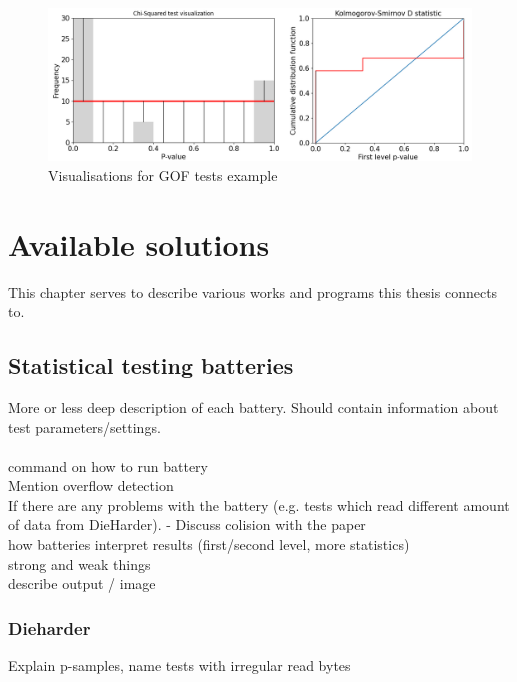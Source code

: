 \documentclass[
  digital,     %
  oneside,     %
  nosansbold,  %
  nocolorbold, %
  nolof,         %
  nolot,         %
]{fithesis4}
\begin{document}
\begin{figure}
  \begin{center}
    \includegraphics[width=13cm]{figures/two_example.png}
  \end{center}
  \caption{Visualisations for GOF tests example}
  \label{fig:two_example}
\end{figure}


\chapter{Available solutions}


This chapter serves to describe various works and programs this thesis connects to. \\


\section{Statistical testing batteries}
More or less deep description of each battery. Should contain information about test parameters/settings.\\
\\
command on how to run battery\\
Mention overflow detection\\
If there are any problems with the battery (e.g. tests which read different amount of data from DieHarder). - Discuss colision with the paper\\

how batteries interpret results (first/second level, more statistics)\\
strong and weak things \\
describe output / image\\

\subsection{Dieharder}
Explain p-samples, name tests with irregular read bytes
\end{document}
